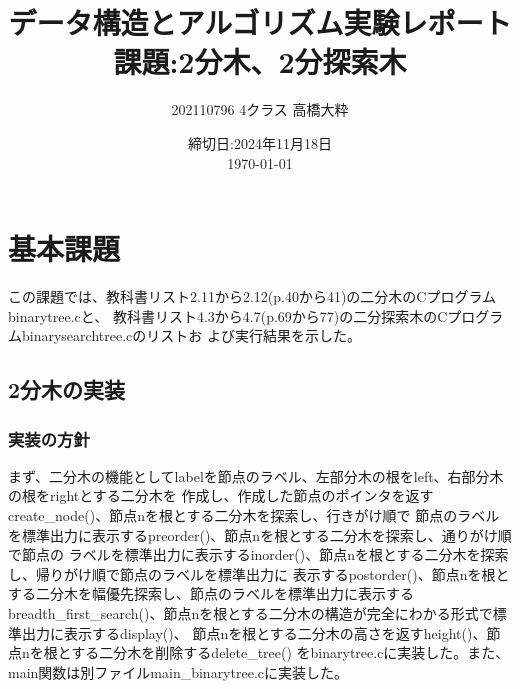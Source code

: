 \documentclass{ltjsarticle}
\begin{document}
\title{データ構造とアルゴリズム実験レポート\\
課題:2分木、2分探索木}
\author{202110796 4クラス 高橋大粋}
\date{締切日:2024年11月18日\\
\today}
\maketitle

\section{基本課題}
この課題では、教科書リスト2.11から2.12(p.40から41)の二分木のCプログラムbinarytree.cと、
教科書リスト4.3から4.7(p.69から77)の二分探索木のCプログラムbinarysearchtree.cのリストお
よび実行結果を示した。
\subsection{2分木の実装}\label{subsec:2分木の実装}
\subsubsection{実装の方針}\label{subsubsec:実装の方針1}
まず、二分木の機能としてlabelを節点のラベル、左部分木の根をleft、右部分木の根をrightとする二分木を
作成し、作成した節点のポインタを返すcreate\_node()、節点nを根とする二分木を探索し、行きがけ順で
節点のラベルを標準出力に表示するpreorder()、節点nを根とする二分木を探索し、通りがけ順で節点の
ラベルを標準出力に表示するinorder()、節点nを根とする二分木を探索し、帰りがけ順で節点のラベルを標準出力に
表示するpostorder()、節点nを根とする二分木を幅優先探索し、節点のラベルを標準出力に表示する
breadth\_first\_search()、節点nを根とする二分木の構造が完全にわかる形式で標準出力に表示するdisplay()、
節点nを根とする二分木の高さを返すheight()、節点nを根とする二分木を削除するdelete\_tree()
をbinarytree.cに実装した。また、main関数は別ファイルmain\_binarytree.cに実装した。
\end{document}
